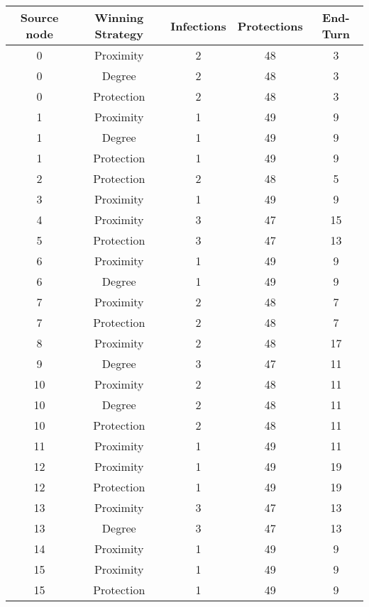 \documentclass[results.tex]{subfiles}
\begin{document}
\begin{center}
  \begin{tabular}{| c || c | c | c | c |}
    \hline
    {\bfseries Source node} & {\bfseries Winning Strategy} & {\bfseries Infections} & {\bfseries Protections} & {\bfseries End-Turn} \\  %
    \hline\hline
    0 & Proximity & 2 & 48 & 3 \\ 
    \hline
    0 & Degree & 2 & 48 & 3 \\ 
    \hline
    0 & Protection & 2 & 48 & 3 \\ 
    \hline
    1 & Proximity & 1 & 49 & 9 \\ 
    \hline
    1 & Degree & 1 & 49 & 9 \\ 
    \hline
    1 & Protection & 1 & 49 & 9 \\ 
    \hline
    2 & Protection & 2 & 48 & 5 \\ 
    \hline
    3 & Proximity & 1 & 49 & 9 \\ 
    \hline
    4 & Proximity & 3 & 47 & 15 \\ 
    \hline
    5 & Protection & 3 & 47 & 13 \\ 
    \hline
    6 & Proximity & 1 & 49 & 9 \\ 
    \hline
    6 & Degree & 1 & 49 & 9 \\ 
    \hline
    7 & Proximity & 2 & 48 & 7 \\ 
    \hline
    7 & Protection & 2 & 48 & 7 \\ 
    \hline
    8 & Proximity & 2 & 48 & 17 \\ 
    \hline
    9 & Degree & 3 & 47 & 11 \\ 
    \hline
    10 & Proximity & 2 & 48 & 11 \\ 
    \hline
    10 & Degree & 2 & 48 & 11 \\ 
    \hline
    10 & Protection & 2 & 48 & 11 \\ 
    \hline
    11 & Proximity & 1 & 49 & 11 \\ 
    \hline
    12 & Proximity & 1 & 49 & 19 \\ 
    \hline
    12 & Protection & 1 & 49 & 19 \\ 
    \hline
    13 & Proximity & 3 & 47 & 13 \\ 
    \hline
    13 & Degree & 3 & 47 & 13 \\ 
    \hline
    14 & Proximity & 1 & 49 & 9 \\ 
    \hline
    15 & Proximity & 1 & 49 & 9 \\ 
    \hline
    15 & Protection & 1 & 49 & 9 \\ 

\end{tabular}
\end{center}
\end{document}
